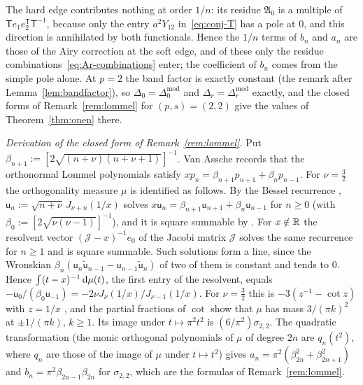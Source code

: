\begin{remark}[The hard edge at order $1/n$; the case $p=2$]\label{rem:second}
The hard edge contributes nothing at order $1/n$: its residue $\mathfrak A_0$ is a multiple of
$\mathsf Te_1e_2^{\mathsf T}\mathsf T^{-1}$, because only the entry $a^2Y_{12}$ in~\eqref{eq:conj-T} has a pole at $0$, and this
direction is annihilated by both functionals. Hence the $1/n$ terms of $b_n$ and $a_n$ are those of the Airy correction
at the soft edge, and of these only the residue combinations~\eqref{eq:Ar-combinations} enter; the coefficient of $b_n$ comes
from the simple pole alone. At $p=2$ the band factor is exactly constant (the remark after Lemma~\ref{lem:bandfactor}), so
$\Delta_0=\Delta_0^{\mathrm{mod}}$ and $\Delta_r=\Delta_r^{\mathrm{mod}}$ exactly, and the closed forms of
Remark~\ref{rem:lommel} for $(p,s)=(2,2)$ give the values of Theorem~\ref{thm:onen} there.

\emph{Derivation of the closed form of Remark~\ref{rem:lommel}.} Put
$\beta_{n+1}:=[2\sqrt{(n+\nu)(n+\nu+1)}]^{-1}$. Van Assche \cite[\S3]{VA} records that the orthonormal Lommel
polynomials satisfy $xp_n=\beta_{n+1}p_{n+1}+\beta_np_{n-1}$. For
$\nu=\frac32$ the orthogonality measure $\mu$ is identified as follows. By the Bessel recurrence
\cite[(10.6.1)]{DLMF}, $\mathsf u_n:=\sqrt{n+\nu}\,J_{\nu+n}(1/x)$ solves $x\mathsf u_n=\beta_{n+1}\mathsf
u_{n+1}+\beta_n\mathsf u_{n-1}$ for $n\ge0$ (with $\beta_0:=[2\sqrt{\nu(\nu-1)}]^{-1}$), and it is square summable by
\cite[(10.2.2)]{DLMF}. For $x\notin\mathbb{R}$ the resolvent vector $(\mathcal J-x)^{-1}e_0$ of the Jacobi matrix $\mathcal J$
solves the same recurrence for $n\ge1$ and is square summable. Such solutions form a line, since the Wronskian
$\beta_n(\mathsf u_n\tilde{\mathsf u}_{n-1}-\mathsf u_{n-1}\tilde{\mathsf u}_n)$ of two of them is constant and tends to $0$. Hence
$\int(t-x)^{-1}\,\mathrm{d}\mu(t)$, the first entry of the resolvent, equals $-\mathsf u_0/(\beta_0\mathsf u_{-1})=-2\nu
J_\nu(1/x)/J_{\nu-1}(1/x)$. For $\nu=\frac32$ this is $-3(z^{-1}-\cot z)$ with $z=1/x$ \cite[(10.16.1),
(10.6.1)]{DLMF}, and the partial fractions of $\cot$ \cite[(4.22.3)]{DLMF} show that $\mu$ has mass $3/(\pi k)^2$ at
$\pm1/(\pi k)$, $k\ge1$. Its image under $t\mapsto\pi^2t^2$ is $(6/\pi^2)\sigma_{2,2}$. The quadratic transformation
(the monic orthogonal polynomials of $\mu$ of degree $2n$ are $q_n(t^2)$, where $q_n$ are those of the image of $\mu$
under $t\mapsto t^2$) gives $a_n=\pi^2(\beta_{2n}^2+\beta_{2n+1}^2)$ and $b_n=\pi^2\beta_{2n-1}\beta_{2n}$ for
$\sigma_{2,2}$, which are the formulas of Remark~\ref{rem:lommel}.
\end{remark}
